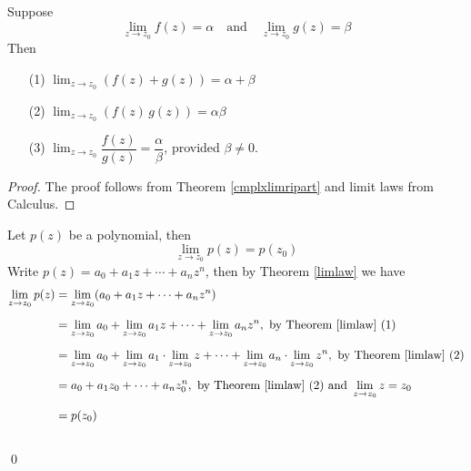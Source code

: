 \vspace*{1em}

\begin{theorem}\label{limlaw}
Suppose
\[\lim_{z \to z_0} f(z) = \alpha \quad \text{and} \quad \lim_{z \to z_0} g(z) = \beta\]
Then
\begin{itemize}
\item[(1)] $\lim_{z \to z_0} (f(z) + g(z)) = \alpha + \beta$
\item[(2)] $\lim_{z \to z_0} (f(z)\,g(z)) = \alpha\beta$
\item[(3)] $\lim_{z \to z_0} \dfrac{f(z)}{g(z)} = \dfrac{\alpha}{\beta}$, provided $\beta \neq 0$.
\end{itemize}
\end{theorem}
\begin{proof}
The proof follows from Theorem \ref{cmplxlimripart} and limit laws from Calculus.
\end{proof}

\vspace*{1em}

\begin{example}\label{polycts}
Let $p(z)$ be a polynomial, then
\[\lim_{z \to z_0}p(z) = p(z_0)\]
Write $p(z) = a_0 + a_1z + \cdots + a_nz^n$, then by Theorem \ref{limlaw} we have
\begin{align*}
\lim_{z \to z_0}p(z) &= \lim_{z \to z_0}(a_0 + a_1z + \cdots + a_nz^n)\\[0.5em]
&= \lim_{z \to z_0} a_0 + \lim_{z \to z_0} a_1z + \cdots + \lim_{z \to z_0} a_nz^n,\ \text{by Theorem \ref{limlaw} (1)}\\[0.5em]
&= \lim_{z \to z_0} a_0 + \lim_{z \to z_0} a_1 \cdot \lim_{z \to z_0} z + \cdots + \lim_{z \to z_0} a_n \cdot \lim_{z \to z_0} z^n,\ \text{by Theorem \ref{limlaw} (2)}\\[0.5em]
&= a_0 + a_1z_0 + \cdots + a_nz_0^n,\ \text{by Theorem \ref{limlaw} (2) and }\lim_{z \to z_0} z = z_0\\[0.5em]
&= p(z_0)
\end{align*}\\[-2em]
\qed
\end{example}

\vspace*{2em}

